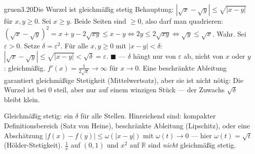 \begin{loesungkarte}{gruen}{3.20}{Die Wurzel ist gleichmäßig stetig}
Behauptung: $|\sqrt x - \sqrt y|\le\sqrt{|x - y|}$ für $x, y\ge0$. Sei $x\ge y$. Beide Seiten sind $\ge0$, also darf man quadrieren: $(\sqrt x - \sqrt y)^{2} = x + y - 2\sqrt{xy}\le x - y\iff2y\le2\sqrt{xy}\iff\sqrt y\le\sqrt x$. Wahr. \checkmark
{}
Sei $\varepsilon > 0$. Setze $\delta = \varepsilon^{2}$. Für alle $x, y\ge0$ mit $|x - y| < \delta$: $|\sqrt x - \sqrt y|\le\sqrt{|x - y|} < \sqrt\delta = \varepsilon$. $\blacksquare$ --- $\delta$ hängt nur von $\varepsilon$ ab, nicht von $x$ oder $y$: gleichmäßig.
$f'(x) = \frac1{2\sqrt x}\to\infty$ für $x\to0$. Eine beschränkte Ableitung garantiert gleichmäßige Stetigkeit (Mittelwertsatz), aber sie ist nicht nötig: Die Wurzel ist bei $0$ steil, aber nur auf einem winzigen Stück --- der Zuwachs $\sqrt{\delta}$ bleibt klein.
\begin{mitnehmen}\kastentext
Gleichmäßig stetig: ein $\delta$ für alle Stellen. Hinreichend sind: kompakter Definitionsbereich (Satz von Heine), beschränkte Ableitung (Lipschitz), oder eine Abschätzung $|f(x) - f(y)|\le\omega(|x - y|)$ mit $\omega(t)\to0$ --- hier $\omega(t) = \sqrt t$ (Hölder-Stetigkeit). $\frac1x$ auf $(0, 1)$ und $x^{2}$ auf $\mathbb R$ sind \emph{nicht} gleichmäßig stetig.
\end{mitnehmen}
\end{loesungkarte}

